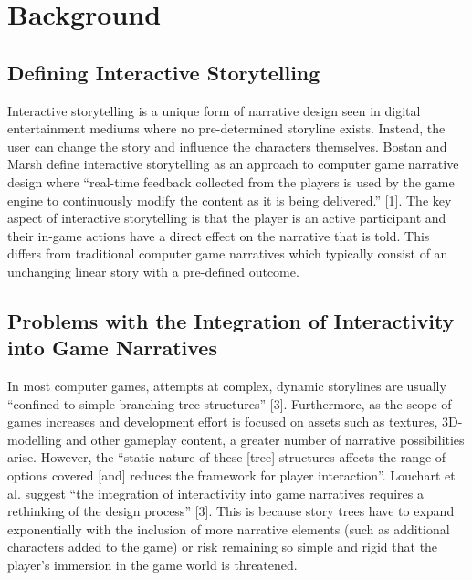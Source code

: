 \documentclass{sig-alternate-05-2015}
\begin{document}


\section{Background}

\subsection{Defining Interactive Storytelling}

Interactive storytelling is a unique form of narrative design seen in digital entertainment mediums where no pre-determined storyline exists. Instead, the user can change the story and influence the characters themselves. Bostan and Marsh define interactive storytelling as an approach to computer game narrative design where ``real-time feedback collected from the players is used by the game engine to continuously modify the content as it is being delivered.'' [1]. The key aspect of interactive storytelling is that the player is an active participant and their in-game actions have a direct effect on the narrative that is told. This differs from traditional computer game narratives which typically consist of an unchanging linear story with a pre-defined outcome.

\subsection{Problems with the Integration of Interactivity into Game Narratives}

In most computer games, attempts at complex, dynamic storylines are usually ``confined to simple branching tree structures'' [3]. Furthermore, as the scope of games increases and development effort is focused on assets such as textures, 3D-modelling and other gameplay content, a greater number of narrative possibilities arise. However, the ``static nature of these [tree] structures affects the range of options covered [and] reduces the framework for player interaction''. Louchart et al. suggest ``the integration of interactivity into game narratives requires a rethinking of the design process'' [3]. This is because story trees have to expand exponentially with the inclusion of more narrative elements (such as additional characters added to the game) or risk remaining so simple and rigid that the player's immersion in the game world is threatened.
\end{document}
